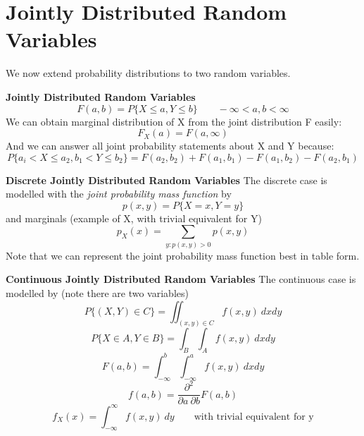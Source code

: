 \documentclass[10pt,a4paper]{article}
\begin{document}
     \section{Jointly Distributed Random Variables}
     We now extend probability distributions to two random variables.
     \begin{framed}
     	\centering\textbf{Jointly Distributed Random Variables}
     	$$F(a,b) = P\{X \leq a, Y \leq b\} \qquad -\infty < a,b < \infty$$
     	We can obtain marginal distribution of X from the joint distribution F easily:
     	$$F_{X}(a) = F(a,\infty)$$
     	And we can answer all joint probability statements about X and Y because: $$P\{a_{i} < X \leq a_{2}, b_{1} < Y \leq b_{2}\} = F(a_{2},b_{2}) + F(a_{1},b_{1}) - F(a_{1},b_{2}) - F(a_{2}, b_{1})$$
     \end{framed}
     \begin{framed}
     	\centering\textbf{Discrete Jointly Distributed Random Variables}
     	The discrete case is modelled with the \emph{joint probability mass function} by $$p(x,y) = P\{X=x,Y=y\}$$ and marginals (example of X, with trivial equivalent for Y) $$p_{X}(x) = \sum_{y:p(x,y)>0}p(x,y)$$ Note that we can represent the joint probability mass function best in table form.
     \end{framed}
     \begin{framed}
     	\centering\textbf{Continuous Jointly Distributed Random Variables} The     continuous case is modelled by (note there are two variables) $$P\{(X,Y) \in C\} = \iint_{(x,y) \in C} f(x,y)\ dxdy$$
     	$$P\{X \in A, Y \in B\} = \int_{B}\int_{A}f(x,y)\ dxdy$$ $$F(a,b) = \int_{-\infty}^{b}\int_{-\infty}^{a}f(x,y)\ dxdy$$ $$f(a,b) = \frac{\partial^{2}}{\partial a \  \partial b}F(a,b)$$ $$f_{X}(x) = \int_{-\infty}^{\infty}f(x,y)\ dy \qquad \text{with trivial equivalent for y}$$
     \end{framed}
     \newpage 
\end{document}
